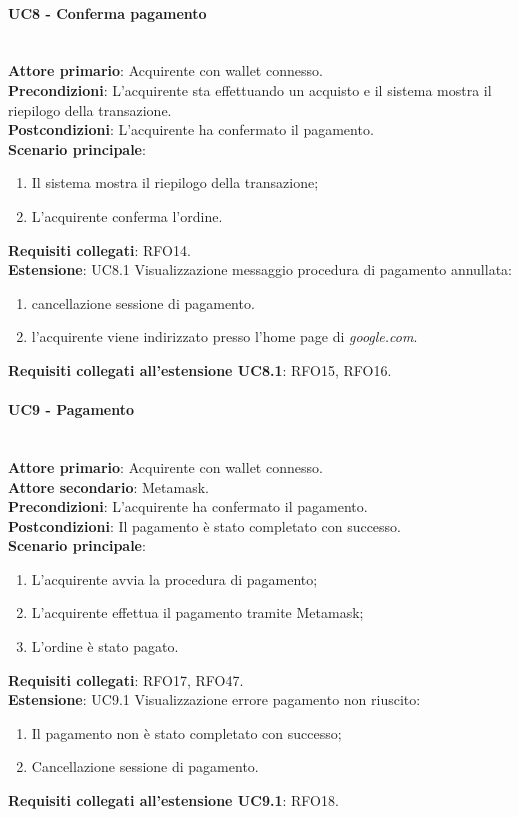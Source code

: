 \documentclass[a4paper, 12pt]{article}
\begin{document}
\paragraph{UC8 - Conferma pagamento}\\
\textbf{Attore primario}: Acquirente con wallet connesso.\\
\textbf{Precondizioni}: L'acquirente sta effettuando un acquisto e il sistema mostra il riepilogo della transazione.\\
\textbf{Postcondizioni}: L'acquirente ha confermato il pagamento.\\
\textbf{Scenario principale}:
\begin{enumerate}
    \item Il sistema mostra il riepilogo della transazione;
    \item L'acquirente conferma l'ordine.
\end{enumerate}
\textbf{Requisiti collegati}: RFO14.\\
\textbf{Estensione}:
UC8.1 Visualizzazione messaggio procedura di pagamento annullata:
\begin{enumerate}
    \item cancellazione sessione di pagamento.
    \item l'acquirente viene indirizzato presso l'home page di \textit{google.com}.
\end{enumerate}
\textbf{Requisiti collegati all'estensione UC8.1}: RFO15, RFO16.

\paragraph{UC9 - Pagamento}\\
\textbf{Attore primario}: Acquirente con wallet connesso.\\
\textbf{Attore secondario}: Metamask.\\
\textbf{Precondizioni}: L'acquirente ha confermato il pagamento.\\
\textbf{Postcondizioni}: Il pagamento è stato completato con successo.\\
\textbf{Scenario principale}:
\begin{enumerate}
    \item L'acquirente avvia la procedura di pagamento;
    \item L'acquirente effettua il pagamento tramite Metamask;
    \item L'ordine è stato pagato.
\end{enumerate}
\textbf{Requisiti collegati}: RFO17, RFO47.\\
\textbf{Estensione}:
UC9.1 Visualizzazione errore pagamento non riuscito:
\begin{enumerate}
    \item Il pagamento non è stato completato con successo;
    \item Cancellazione sessione di pagamento.
\end{enumerate}
\textbf{Requisiti collegati all'estensione UC9.1}: RFO18.
\end{document}
